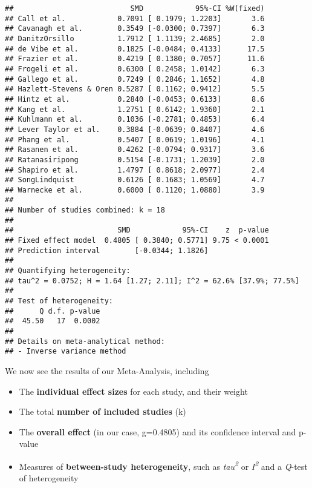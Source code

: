 \documentclass[]{book}
\providecommand{\tightlist}{%
  \setlength{\itemsep}{0pt}\setlength{\parskip}{0pt}}
\theoremstyle{definition}
\theoremstyle{definition}
\theoremstyle{definition}
\theoremstyle{remark}
\begin{document}
\begin{verbatim}
##                           SMD            95%-CI %W(fixed)
## Call et al.            0.7091 [ 0.1979; 1.2203]       3.6
## Cavanagh et al.        0.3549 [-0.0300; 0.7397]       6.3
## DanitzOrsillo          1.7912 [ 1.1139; 2.4685]       2.0
## de Vibe et al.         0.1825 [-0.0484; 0.4133]      17.5
## Frazier et al.         0.4219 [ 0.1380; 0.7057]      11.6
## Frogeli et al.         0.6300 [ 0.2458; 1.0142]       6.3
## Gallego et al.         0.7249 [ 0.2846; 1.1652]       4.8
## Hazlett-Stevens & Oren 0.5287 [ 0.1162; 0.9412]       5.5
## Hintz et al.           0.2840 [-0.0453; 0.6133]       8.6
## Kang et al.            1.2751 [ 0.6142; 1.9360]       2.1
## Kuhlmann et al.        0.1036 [-0.2781; 0.4853]       6.4
## Lever Taylor et al.    0.3884 [-0.0639; 0.8407]       4.6
## Phang et al.           0.5407 [ 0.0619; 1.0196]       4.1
## Rasanen et al.         0.4262 [-0.0794; 0.9317]       3.6
## Ratanasiripong         0.5154 [-0.1731; 1.2039]       2.0
## Shapiro et al.         1.4797 [ 0.8618; 2.0977]       2.4
## SongLindquist          0.6126 [ 0.1683; 1.0569]       4.7
## Warnecke et al.        0.6000 [ 0.1120; 1.0880]       3.9
## 
## Number of studies combined: k = 18
## 
##                        SMD            95%-CI    z  p-value
## Fixed effect model  0.4805 [ 0.3840; 0.5771] 9.75 < 0.0001
## Prediction interval        [-0.0344; 1.1826]              
## 
## Quantifying heterogeneity:
## tau^2 = 0.0752; H = 1.64 [1.27; 2.11]; I^2 = 62.6% [37.9%; 77.5%]
## 
## Test of heterogeneity:
##      Q d.f. p-value
##  45.50   17  0.0002
## 
## Details on meta-analytical method:
## - Inverse variance method
\end{verbatim}

We now see the results of our Meta-Analysis, including

\begin{itemize}
\tightlist
\item
  The \textbf{individual effect sizes} for each study, and their weight
\item
  The total \textbf{number of included studies} (k)
\item
  The \textbf{overall effect} (in our case, g=0.4805) and its confidence
  interval and p-value
\item
  Measures of \textbf{between-study heterogeneity}, such as
  \emph{tau\textsuperscript{2}} or \emph{I\textsuperscript{2}} and a
  \emph{Q}-test of heterogeneity
\end{itemize}
\end{document}
